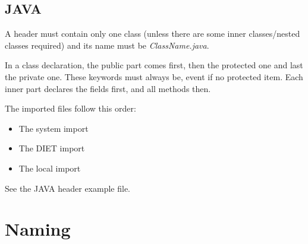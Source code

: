 \documentclass{article}
\begin{document}
\subsection{JAVA}
A header must contain only one class (unless there are some inner classes/nested
 classes required) and its name must be \textit{ClassName.java}.

In a class declaration, the public part comes first, then the protected one and 
last the private one. These keywords must always be, event if no protected item.
Each inner part declares the fields first, and all methods then.

The imported files follow this order:
\begin{itemize}
\item The system import
\item The DIET import
\item The local import
\end{itemize}

See the JAVA header example file.


\section{Naming}
\end{document}
